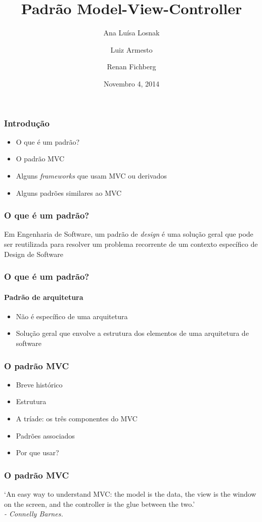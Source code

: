\documentclass{beamer}
\title[Padrão Model-View-Controller]{Padrão Model-View-Controller}
\author{Ana Luísa Losnak \and Luiz Armesto \and  Renan Fichberg}
\date{Novembro 4, 2014}
\institute{Instituto de Matemática e Estatística da Universidade de São Paulo (IME-USP)}
\begin{document}
\begin{frame}
\titlepage
\end{frame}

\begin{frame}
\frametitle{Introdução}
\begin{itemize}
	\item O que é um padrão?
	\item O padrão MVC
	\item Alguns \textit{frameworks} que usam MVC ou derivados
	\item Alguns padrões similares ao MVC
\end{itemize}
\end{frame}

\begin{frame}
\frametitle{O que é um padrão?}
	Em Engenharia de Software, um padrão de \textit{design} é uma solução geral que pode ser reutilizada para resolver um problema recorrente de um contexto específico de Design de Software
\end{frame}

\begin{frame}
\frametitle{O que é um padrão?}
\framesubtitle{Padrão de arquitetura}
  \begin{itemize}
  \item {Não é específico de uma arquitetura}
  \item {Solução geral que envolve a estrutura dos elementos de uma arquitetura de software}
  \end{itemize}
\end{frame}


\begin{frame}
\frametitle{O padrão MVC}
\begin{itemize}
	\item Breve histórico
	\item Estrutura
	\item A tríade: os três componentes do MVC
	\item Padrões associados
	\item Por que usar?
\end{itemize}
\end{frame}

\begin{frame}
\frametitle{O padrão MVC}
	`An easy way to understand MVC: the model is the data, the view is the window on the screen, and the controller is the glue between the two.' \\
	\hfill \textit{- Connelly Barnes.}
\end{frame}
\end{document}
